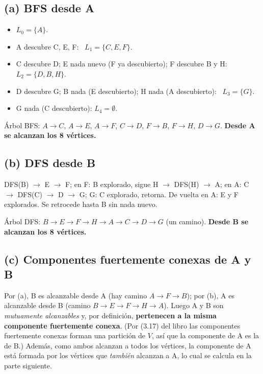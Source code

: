 \subsection*{(a) BFS desde A}
\begin{itemize}[nosep]
\item $L_0=\{A\}$.
\item A descubre C, E, F: \ $L_1=\{C,E,F\}$.
\item C descubre D; E nada nuevo (F ya descubierto); F descubre B y H: \ $L_2=\{D,B,H\}$.
\item D descubre G; B nada (E descubierto); H nada (A descubierto): \ $L_3=\{G\}$.
\item G nada (C descubierto): $L_4=\emptyset$.
\end{itemize}
Árbol BFS: $A\to C$, $A\to E$, $A\to F$, $C\to D$, $F\to B$, $F\to H$, $D\to G$. \textbf{Desde A se
alcanzan los 8 vértices.}
\begin{center}
\end{center}

\subsection*{(b) DFS desde B}
\textsc{DFS}(B) $\to$ E $\to$ F; en F: B explorado, sigue H $\to$ \textsc{DFS}(H) $\to$ A; en A: C
$\to$ \textsc{DFS}(C) $\to$ D $\to$ G; G: C explorado, retorna. De vuelta en A: E y F explorados.
Se retrocede hasta B sin nada nuevo.

Árbol DFS: $B\to E\to F\to H\to A\to C\to D\to G$ (un camino). \textbf{Desde B se alcanzan los 8
vértices.}

\subsection*{(c) Componentes fuertemente conexas de A y B}
Por (a), B es alcanzable desde A (hay camino $A\to F\to B$); por (b), A es alcanzable desde B (camino
$B\to E\to F\to H\to A$). Luego A y B son \emph{mutuamente alcanzables} y, por definición,
\textbf{pertenecen a la misma componente fuertemente conexa}. (Por (3.17) del libro las componentes
fuertemente conexas forman una partición de $V$, así que la componente de A es la de B.) Además, como
ambos alcanzan a todos los vértices, la componente de A está formada por los vértices que \emph{también}
alcanzan a A, lo cual se calcula en la parte siguiente.

